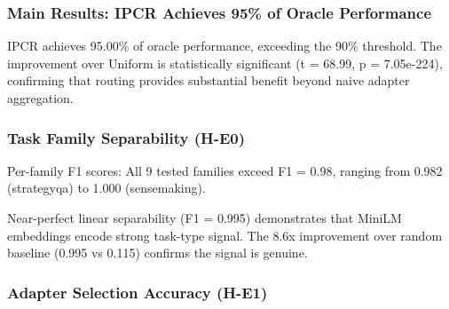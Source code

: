 
\subsubsection{Main Results: IPCR Achieves 95\% of Oracle Performance}

\begin{table}[htbp]
\centering
{}
\end{table}

IPCR achieves 95.00\% of oracle performance, exceeding the 90\% threshold. The improvement over Uniform is statistically significant (t = 68.99, p = 7.05e-224), confirming that routing provides substantial benefit beyond naive adapter aggregation.

\subsubsection{Task Family Separability (H-E0)}

\begin{table}[htbp]
\centering
{}
\end{table}

Per-family F1 scores: All 9 tested families exceed F1 = 0.98, ranging from 0.982 (strategyqa) to 1.000 (sensemaking).

Near-perfect linear separability (F1 = 0.995) demonstrates that MiniLM embeddings encode strong task-type signal. The 8.6x improvement over random baseline (0.995 vs 0.115) confirms the signal is genuine.

\subsubsection{Adapter Selection Accuracy (H-E1)}

